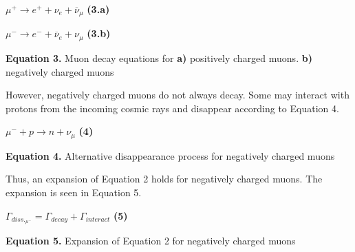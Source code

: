\documentclass{article}
\begin{document}
\begin{center}
    
    $\mu^{+} \rightarrow e^{+} + \nu_{e} + \overline{\nu}_{\mu}$ \hspace{10mm} \textbf{(3.a)}
    
    \vspace{1 mm}
    
    $\mu^{-} \rightarrow e^{-} + \overline{\nu}_{e} + \nu_{\mu}$ \hspace{10mm} \textbf{(3.b)}
    
    \vspace{5mm}
    
    \textbf{Equation 3.} Muon decay equations for \textbf{a)} positively charged muons. \textbf{b)} negatively charged muons 
    
\end{center}
  
However, negatively charged muons do not always decay. Some may interact with protons from the incoming cosmic rays and disappear according to Equation 4. 

\begin{center}
    
    $\mu^{-} + \textit{p} \rightarrow \textit{n} +  \nu_{\mu}$ \hspace{10mm} \textbf{(4)}
    
    \vspace{5mm}
    
    \textbf{Equation 4.} Alternative disappearance process for negatively charged muons 
    
\end{center}

Thus, an expansion of Equation 2 holds for negatively charged muons. The expansion is seen in Equation 5. 
\begin{center}
    
    $\Gamma_{diss._{\mu^{-}}} = \Gamma_{decay} + \Gamma_{interact}$ \hspace{10mm} \textbf{(5)}
    
    \vspace{5mm}
    
    \textbf{Equation 5.} Expansion of Equation 2 for negatively charged muons
    
\end{center}
\end{document}
